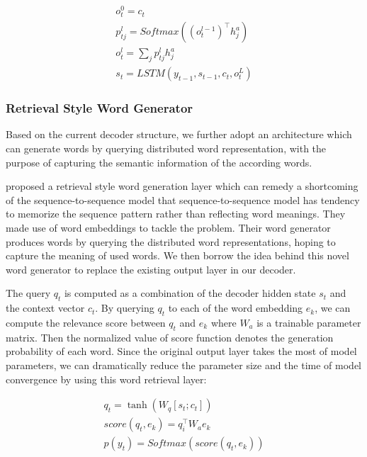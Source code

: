 \documentclass[letterpaper]{article} %
\begin{document}
\begin{gather}
o^0_t = c_t \label{eq_14} \\
p^l_{tj} = Softmax((o^{l-1}_t)^{\top}h^a_{j}) \label{eq_15} \\
o_t^l = \sum_{j}p^l_{tj}h^a_{j}  \label{eq_16} \\
s_t = LSTM(y_{t-1}, s_{t-1}, c_t, o_t^L) \label{eq_17}
\end{gather}

%
%
%

\subsubsection{Retrieval Style Word Generator}
Based on the current decoder structure, we further adopt an architecture which can generate words by querying distributed word representation, with the purpose of capturing the semantic information of the according words.

\cite{ma2018query} proposed a retrieval style word generation layer which can remedy a shortcoming of the sequence-to-sequence model that sequence-to-sequence model has tendency to memorize the sequence pattern rather than reflecting word meanings. They made use of word embeddings to tackle the problem. Their word generator produces words by querying the distributed word representations, hoping to capture the meaning of used words. We then borrow the idea behind this novel word generator to replace the existing output layer in our decoder.

The query \(q_t\) is computed as a combination of the decoder hidden state \(s_t\) and the context vector \(c_t\). By querying \(q_t\) to each of the word embedding \(e_k\), we can compute the relevance score between \(q_t\) and \(e_k\) where \(W_a\) is a trainable parameter matrix. Then the normalized value of score function denotes the generation probability of each word. Since the original output layer takes the most of model parameters, we can dramatically reduce the parameter size and the time of model convergence by using this word retrieval layer:

\begin{gather}
q_t = \tanh(W_q[s_t;c_t]) \label{eq_18} \\
score(q_t, e_k) = q^\top_iW_ae_k \label{eq_19} \\
p(y_t) = Softmax(score(q_t, e_k)) \label{eq_20}
\end{gather}
\end{document}
